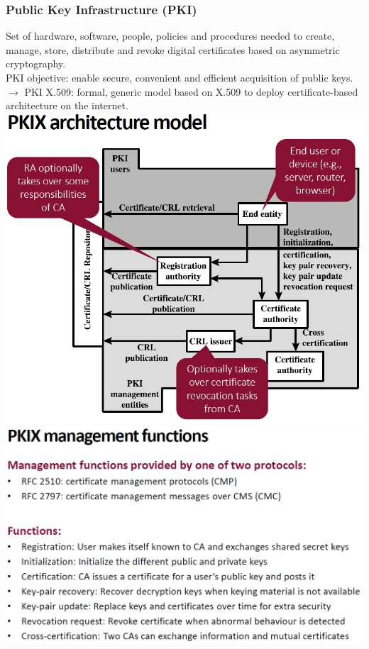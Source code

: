 \documentclass[12pt]{article}
\begin{document}
 \subsubsection{Public Key Infrastructure (PKI)}
 Set of hardware, software, people, policies and procedures needed to create, manage, store, distribute and revoke digital certificates based on asymmetric cryptography.\\
 PKI objective: enable secure, convenient and efficient acquisition of public keys.\\
 $\rightarrow$ PKI X.509: formal, generic model based on X.509 to deploy certificate-based architecture on the internet.\\
 \includegraphics[width=\linewidth]{./slides/L5P5PKIMOD.PNG}\\
 \includegraphics[width=\linewidth]{./slides/L5P5PKIMAN.PNG}
  
\end{document}
